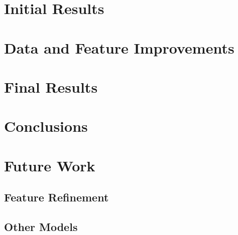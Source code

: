 \documentclass{article}
\begin{document}
\pagebreak

\section{Initial Results}

\section{Data and Feature Improvements}

\section{Final Results}

\pagebreak

\section{Conclusions}

\section{Future Work}

\subsection{Feature Refinement}

\subsection{Other Models}




\end{document}
